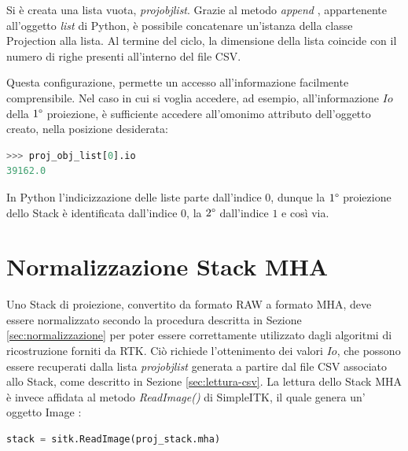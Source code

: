 \documentclass[a4paper,12pt, doubleside]{report}
\begin{document}
                Si è creata una lista vuota, \textit{proj\textunderscore obj\textunderscore list}. Grazie al metodo \textit{append} \cite{python-append}, appartenente all'oggetto \textit{list} di Python, è possibile concatenare un'istanza della classe Projection alla lista. Al termine del ciclo, la dimensione della lista coincide con il numero di righe presenti all'interno del file CSV.
            
            \bigskip
            \par
                Questa configurazione, permette un accesso all'informazione facilmente comprensibile. Nel caso in cui si voglia accedere, ad esempio, all'informazione $Io$ della $1\degree$ proiezione, è sufficiente accedere all'omonimo attributo dell'oggetto creato, nella posizione desiderata: 
            
                \begin{lstlisting}[language=python, frame=bt]
>>> proj_obj_list[0].io
39162.0
                \end{lstlisting}
            
               In Python l'indicizzazione delle liste parte dall'indice $0$, dunque la $1\degree$ proiezione dello Stack è identificata dall'indice $0$, la $2\degree$ dall'indice $1$ e così via.
        
        \section{Normalizzazione Stack MHA}
            \label{sec:norm-disp}
            
            \par
                Uno Stack di proiezione, convertito da formato RAW a formato MHA, deve essere normalizzato secondo la procedura descritta in Sezione \ref{sec:normalizzazione} per poter essere correttamente utilizzato dagli algoritmi di ricostruzione forniti da RTK. Ciò richiede l'ottenimento dei valori $Io$, che possono essere recuperati dalla lista \textit{proj\textunderscore obj\textunderscore list} generata a partire dal file CSV associato allo Stack, come descritto in Sezione \ref{sec:lettura-csv}. La lettura dello Stack MHA è invece affidata al metodo \textit{ReadImage()} di SimpleITK, il quale genera un' oggetto Image \cite{sitk-image}:
                
                \begin{lstlisting}[language=python, frame=bt]
stack = sitk.ReadImage(proj_stack.mha)
                \end{lstlisting}
                
\end{document}
